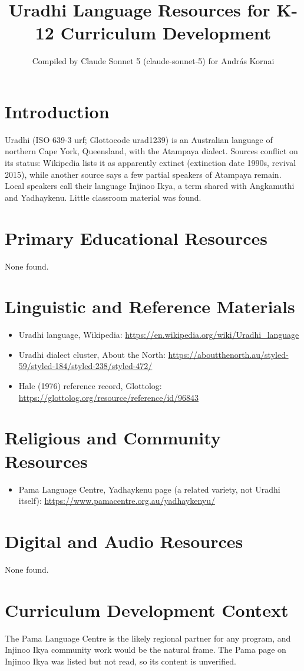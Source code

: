 \documentclass[12pt]{article}
\title{Uradhi Language Resources for K-12 Curriculum Development}
\author{Compiled by Claude Sonnet 5 (claude-sonnet-5) for Andr\'as Kornai}
\date{}
\begin{document}
\maketitle
\section{Introduction}
Uradhi (ISO 639-3 urf; Glottocode urad1239) is an Australian language of northern Cape York, Queensland, with the Atampaya dialect. Sources conflict on its status: Wikipedia lists it as apparently extinct (extinction date 1990s, revival 2015), while another source says a few partial speakers of Atampaya remain. Local speakers call their language Injinoo Ikya, a term shared with Angkamuthi and Yadhaykenu. Little classroom material was found.
\section{Primary Educational Resources}
None found.
\section{Linguistic and Reference Materials}
\begin{itemize}
\item Uradhi language, Wikipedia: \url{https://en.wikipedia.org/wiki/Uradhi_language}
\item Uradhi dialect cluster, About the North: \url{https://aboutthenorth.au/styled-59/styled-184/styled-238/styled-472/}
\item Hale (1976) reference record, Glottolog: \url{https://glottolog.org/resource/reference/id/96843}
\end{itemize}
\section{Religious and Community Resources}
\begin{itemize}
\item Pama Language Centre, Yadhaykenu page (a related variety, not Uradhi itself): \url{https://www.pamacentre.org.au/yadhaykenyu/}
\end{itemize}
\section{Digital and Audio Resources}
None found.
\section{Curriculum Development Context}
The Pama Language Centre is the likely regional partner for any program, and Injinoo Ikya community work would be the natural frame. The Pama page on Injinoo Ikya was listed but not read, so its content is unverified.
\end{document}
